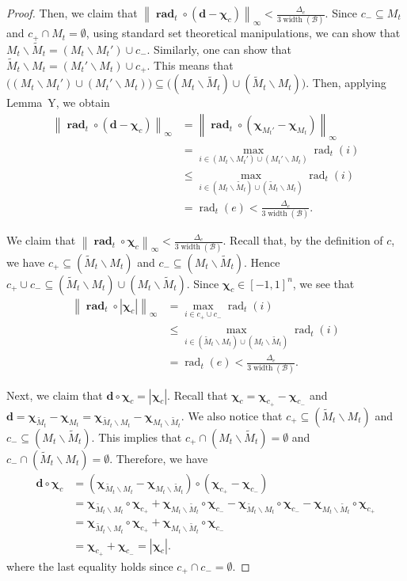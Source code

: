 \documentclass{article}
\newcommand{\B}{\mathcal B}
\newcommand{\del}{\backslash}
\DeclareMathOperator{\rank}{width}
\DeclareMathOperator{\rad}{rad}
\newcommand{\nor}[1]{\left\|#1\right\|}
\renewcommand{\vec}[1]{\boldsymbol{#1}}
\renewcommand{\odot}{\circ}
\begin{document}
\begin{spacing}{1.1}
\begin{proof}
Then, we claim that $\nor{\vec \rad_t \odot (\vec d-\vec \chi_c)}_\infty < \frac{\Delta_e}{3\rank(\B)}$.
Since $c_-\subseteq M_t$ and $c_+\cap M_t = \emptyset$, using standard set theoretical manipulations, we can show that $M_t \del \tilde M_t= (M_t \del M_t') \cup c_-$. 
Similarly, one can show that $\tilde M_t \del M_t = (M_t' \del M_t) \cup c_+$. 
This means that $\big((M_t \del M_t') \cup (M_t'\del M_t)\big) \subseteq \big((M_t \del \tilde M_t ) \cup (\tilde M_t \del M_t)\big)$.
Then, applying Lemma~Y, we obtain
\begin{align}
   \nor{\vec \rad_t \odot (\vec d-\vec\chi_c)}_\infty 
   &= \nor{\vec \rad_t \odot (\vec \chi_{M_t'} - \vec\chi_{M_t})}_\infty \nonumber\\
   &= \max_{i\in (M_t \del M_t') \cup (M_t'\del M_t) } \rad_t(i) \nonumber \\
   &\le \max_{i\in (M_t \del \tilde M_t ) \cup (\tilde M_t \del M_t)}  \rad_t(i) \nonumber \\
   & = \rad_t(e) < \frac{\Delta_e}{3\rank(\B)} \label{eq:u-c-1-0}.
\end{align}

We claim that $\nor{\vec \rad_t \odot \vec \chi_c}_\infty < \frac{\Delta_e}{3\rank(\B)}$.
Recall that, by the definition of $c$, we have
$c_+\subseteq (\tilde M_t \del M_t)$ and $c_-\subseteq (M_t\del \tilde M_t)$. 
Hence $c_+\cup c_- \subseteq  (\tilde M_t \del M_t)\cup (M_t\del \tilde M_t)$.
Since $\vec \chi_c \in [-1,1]^n$, we see that 
\begin{align}
\nor{\vec \rad_t \odot |\vec \chi_c|}_\infty &= \max_{i\in  c_+\cup c_-} \rad_t(i) \nonumber \\
									    &\le \max_{i\in  (\tilde M_t \del M_t)\cup (M_t\del \tilde M_t)} \rad_t(i)  \nonumber \\
									    &= \rad_t(e) < \frac{\Delta_e}{3\rank(\B)} \label{eq:u-c-1-0-1}.
\end{align}


Next, we claim that $\vec d \odot \vec \chi_c = |\vec \chi_c|$.
Recall that $\vec\chi_c = \vec\chi_{c_+}-\vec\chi_{c_-}$
and $\vec d = \vec \chi_{\tilde M_t}-\vec \chi_{M_t} = \vec\chi_{\tilde M_t\del M_t} - \vec\chi_{M_t\del \tilde M_t}$.
We also notice that $c_+ \subseteq (\tilde M_t \del M_t)$ and $c_- \subseteq (M_t \del \tilde M_t)$.
This implies that $c_+ \cap (M_t \del \tilde M_t) = \emptyset$ and $c_-\cap (\tilde M_t \del M_t) = \emptyset$.
Therefore, we have
\begin{align*}
\vec d \odot \vec \chi_c &= (\vec\chi_{\tilde M_t\del M_t} - \vec\chi_{M_t\del \tilde M_t})\odot(\vec\chi_{c_+}-\vec\chi_{c_-})\\
&= \vec\chi_{\tilde M_t\del M_t}\odot \vec\chi_{c_+}+
   \vec\chi_{M_t \del \tilde M_t}\odot \vec\chi_{c_-}-
   \vec\chi_{\tilde M_t\del M_t}\odot \vec\chi_{c_-}-
   \vec\chi_{M_t\del \tilde M_t}\odot \vec\chi_{c_+}\\
&= \vec\chi_{\tilde M_t\del M_t}\odot \vec\chi_{c_+}+
   \vec\chi_{M_t \del \tilde M_t}\odot \vec\chi_{c_-} \\
&= \vec\chi_{c_+}+\vec\chi_{c_-} =|\vec\chi_c|. 
\end{align*}
where the last equality holds since $c_+\cap c_- =\emptyset$.


\end{proof}
\end{spacing}
\end{document}
